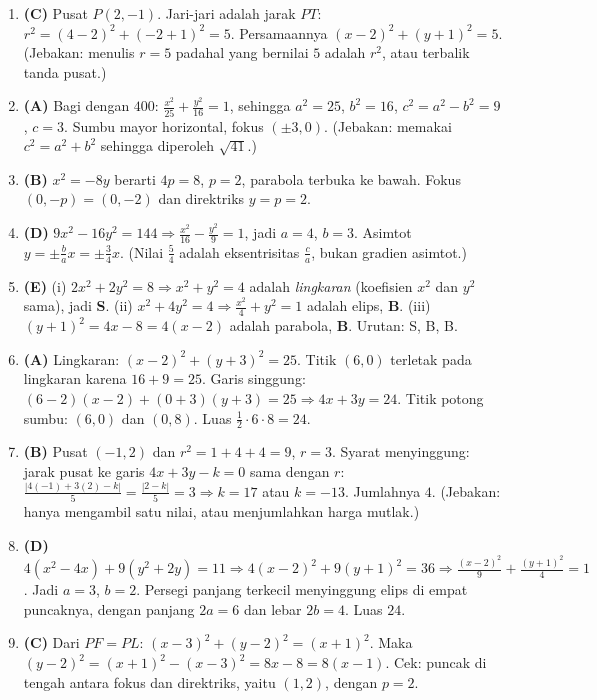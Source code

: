 \documentclass[a4paper,11pt]{article}
\begin{document}
\small\begin{enumerate}[leftmargin=2em,itemsep=2pt,topsep=2pt]
\item[\textbf{1.}] \textbf{(C)} Pusat $P(2,-1)$. Jari-jari adalah jarak $PT$: $r^2=(4-2)^2+(-2+1)^2=5$. Persamaannya $(x-2)^2+(y+1)^2=5$. (Jebakan: menulis $r=5$ padahal yang bernilai $5$ adalah $r^2$, atau terbalik tanda pusat.)
\item[\textbf{2.}] \textbf{(A)} Bagi dengan $400$: $\frac{x^2}{25}+\frac{y^2}{16}=1$, sehingga $a^2=25$, $b^2=16$, $c^2=a^2-b^2=9$, $c=3$. Sumbu mayor horizontal, fokus $(\pm3,0)$. (Jebakan: memakai $c^2=a^2+b^2$ sehingga diperoleh $\sqrt{41}$.)
\item[\textbf{3.}] \textbf{(B)} $x^2=-8y$ berarti $4p=8$, $p=2$, parabola terbuka ke bawah. Fokus $(0,-p)=(0,-2)$ dan direktriks $y=p=2$.
\item[\textbf{4.}] \textbf{(D)} $9x^2-16y^2=144\Rightarrow\frac{x^2}{16}-\frac{y^2}{9}=1$, jadi $a=4$, $b=3$. Asimtot $y=\pm\frac bax=\pm\frac34x$. (Nilai $\frac54$ adalah eksentrisitas $\frac ca$, bukan gradien asimtot.)
\item[\textbf{5.}] \textbf{(E)} (i) $2x^2+2y^2=8\Rightarrow x^2+y^2=4$ adalah \emph{lingkaran} (koefisien $x^2$ dan $y^2$ sama), jadi \textbf{S}. (ii) $x^2+4y^2=4\Rightarrow\frac{x^2}4+y^2=1$ adalah elips, \textbf{B}. (iii) $(y+1)^2=4x-8=4(x-2)$ adalah parabola, \textbf{B}. Urutan: S, B, B.
\item[\textbf{6.}] \textbf{(A)} Lingkaran: $(x-2)^2+(y+3)^2=25$. Titik $(6,0)$ terletak pada lingkaran karena $16+9=25$. Garis singgung: $(6-2)(x-2)+(0+3)(y+3)=25\Rightarrow4x+3y=24$. Titik potong sumbu: $(6,0)$ dan $(0,8)$. Luas $\frac12\cdot6\cdot8=24$.
\item[\textbf{7.}] \textbf{(B)} Pusat $(-1,2)$ dan $r^2=1+4+4=9$, $r=3$. Syarat menyinggung: jarak pusat ke garis $4x+3y-k=0$ sama dengan $r$: $\frac{|4(-1)+3(2)-k|}{5}=\frac{|2-k|}5=3\Rightarrow k=17$ atau $k=-13$. Jumlahnya $4$. (Jebakan: hanya mengambil satu nilai, atau menjumlahkan harga mutlak.)
\item[\textbf{8.}] \textbf{(D)} $4(x^2-4x)+9(y^2+2y)=11\Rightarrow4(x-2)^2+9(y+1)^2=36\Rightarrow\frac{(x-2)^2}9+\frac{(y+1)^2}4=1$. Jadi $a=3$, $b=2$. Persegi panjang terkecil menyinggung elips di empat puncaknya, dengan panjang $2a=6$ dan lebar $2b=4$. Luas $24$.
\item[\textbf{9.}] \textbf{(C)} Dari $PF=PL$: $(x-3)^2+(y-2)^2=(x+1)^2$. Maka $(y-2)^2=(x+1)^2-(x-3)^2=8x-8=8(x-1)$. Cek: puncak di tengah antara fokus dan direktriks, yaitu $(1,2)$, dengan $p=2$.

\end{enumerate}
\end{document}
